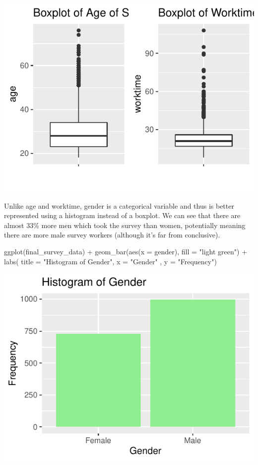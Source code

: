 \documentclass[
]{article}
\newenvironment{Shaded}{\begin{snugshade}}{\end{snugshade}}
\newcommand{\AttributeTok}[1]{\textcolor[rgb]{0.77,0.63,0.00}{#1}}
\newcommand{\FunctionTok}[1]{\textcolor[rgb]{0.00,0.00,0.00}{#1}}
\newcommand{\NormalTok}[1]{#1}
\newcommand{\SpecialCharTok}[1]{\textcolor[rgb]{0.00,0.00,0.00}{#1}}
\newcommand{\StringTok}[1]{\textcolor[rgb]{0.31,0.60,0.02}{#1}}
\begin{document}
\includegraphics{hw1_sp2022_files/figure-latex/unnamed-chunk-10-1.pdf}

Unlike age and worktime, gender is a categorical variable and thus is
better represented using a histogram instead of a boxplot. We can see
that there are almost 33\% more men which took the survey than women,
potentially meaning there are more male survey workers (although it's
far from conclusive).

\begin{Shaded}
\begin{Highlighting}[]
\FunctionTok{ggplot}\NormalTok{(final\_survey\_data) }\SpecialCharTok{+} 
  \FunctionTok{geom\_bar}\NormalTok{(}\FunctionTok{aes}\NormalTok{(}\AttributeTok{x =}\NormalTok{ gender), }\AttributeTok{fill =} \StringTok{"light green"}\NormalTok{) }\SpecialCharTok{+}
  \FunctionTok{labs}\NormalTok{( }\AttributeTok{title =} \StringTok{"Histogram of Gender"}\NormalTok{, }\AttributeTok{x =} \StringTok{"Gender"}\NormalTok{ , }\AttributeTok{y =} \StringTok{"Frequency"}\NormalTok{)}
\end{Highlighting}
\end{Shaded}

\includegraphics{hw1_sp2022_files/figure-latex/unnamed-chunk-11-1.pdf}
\end{document}
